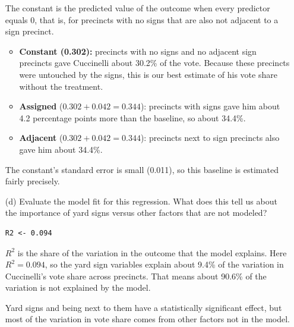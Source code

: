 \documentclass[12pt,letterpaper]{article}
\begin{document}
\begin{enumerate}
\vspace{.3cm}
\noindent The constant is the predicted value of the outcome when every predictor equals 0, that is, for precincts with no signs that are also not adjacent to a sign precinct.

\begin{itemize}
	\item \textbf{Constant (0.302):} precincts with no signs and no adjacent sign precincts gave Cuccinelli about 30.2\% of the vote. Because these precincts were untouched by the signs, this is our best estimate of his vote share without the treatment.
	\item \textbf{Assigned} ($0.302 + 0.042 = 0.344$): precincts with signs gave him about 4.2 percentage points more than the baseline, so about 34.4\%.
	\item \textbf{Adjacent} ($0.302 + 0.042 = 0.344$): precincts next to sign precincts also gave him about 34.4\%.
\end{itemize}

\noindent The constant's standard error is small (0.011), so this baseline is estimated fairly precisely.

\vspace{.5cm}

\item [(d)] Evaluate the model fit for this regression.  What does this tell us about the importance of yard signs versus other factors that are not modeled?

\vspace{.3cm}
\begin{lstlisting}
R2 <- 0.094
\end{lstlisting}

\noindent $R^2$ is the share of the variation in the outcome that the model explains. Here $R^2 = 0.094$, so the yard sign variables explain about 9.4\% of the variation in Cuccinelli's vote share across precincts. That means about 90.6\% of the variation is not explained by the model.

\noindent Yard signs and being next to them have a statistically significant effect, but most of the variation in vote share comes from other factors not in the model.

\end{enumerate}  
\end{document}
